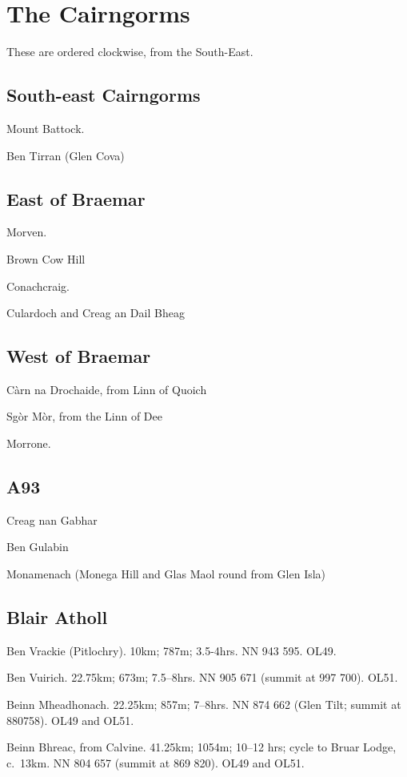 \section{The Cairngorms}

These are ordered clockwise, from the South-East.

\subsection{South-east Cairngorms}


Mount Battock.

Ben Tirran (Glen Cova)


\subsection{East of Braemar}

Morven.

Brown Cow Hill

Conachcraig.

Culardoch and Creag an Dail Bheag


\subsection{West of Braemar}

Càrn na Drochaide, from Linn of Quoich

Sgòr Mòr, from the Linn of Dee

Morrone.


\subsection{A93}

Creag nan Gabhar

Ben Gulabin

Monamenach  (Monega Hill and Glas Maol round from Glen Isla)


\subsection{Blair Atholl}

\begin{munros}
\item
Ben Vrackie (Pitlochry).  10km; 787m; 3.5-4hrs.  NN 943 595.  OL49.

\item\target
Ben Vuirich.  22.75km; 673m; 7.5--8hrs.  NN 905 671 (summit at 997 700).  OL51.

\item\target
Beinn Mheadhonach.  22.25km; 857m; 7--8hrs. NN 874 662 (Glen Tilt; summit at
880758).  OL49 and OL51.

\item\target Beinn Bhreac, from Calvine.  41.25km; 1054m; 10--12 hrs; cycle to
  Bruar Lodge, c.~13km.  NN 804 657 (summit at 869 820).  OL49 and OL51.
\end{munros}

